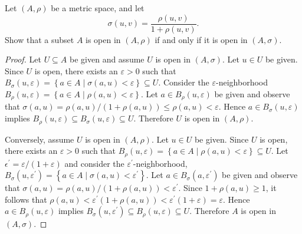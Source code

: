 \documentclass[10pt]{amsart}
\begin{document}
\begin{ex4}{}
  Let $(A,\rho)$ be a metric space, and let 
  $$\sigma(u,v) = \frac{\rho(u,v)}{1 + \rho(u,v)}.$$
  Show that a subset $A$ is open in $(A,\rho)$ if and only if it is open in $(A,\sigma)$.
  
  \begin{proof}
    Let $U \subseteq A$ be given and assume $U$ is open in $(A,\sigma)$.
    Let $u \in U$ be given.
    Since $U$ is open, there exists an $\varepsilon > 0$ such that $B_\sigma(u,\varepsilon) = \left\{a \in A \mid \sigma(a,u) < \varepsilon\right\} \subseteq U$.
    Consider the $\varepsilon$-neighborhood $B_\rho(u,\varepsilon) = \left\{ a \in A \mid \rho(a,u) < \varepsilon\right\}$.
    Let $a \in B_\rho(u,\varepsilon)$ be given and observe that $\sigma(a,u) = \rho(a,u)/(1 + \rho(a,u)) \leq \rho(a,u) < \varepsilon$.
    Hence $a \in B_\sigma(u,\varepsilon)$ implies $B_\rho(u,\varepsilon) \subseteq B_\sigma(u,\varepsilon) \subseteq U$.
    Therefore $U$ is open in $(A,\rho)$.
    
    Conversely, assume $U$ is open in $(A,\rho)$.
    Let $u \in U$ be given.
    Since $U$ is open, there exists an $\varepsilon > 0$ such that $B_\rho(u,\varepsilon) = \left\{a \in A \mid \rho(a,u) < \varepsilon\right\} \subseteq U$.
    Let $\epsilon^{\prime} = \varepsilon/(1 + \varepsilon)$ and consider the $\varepsilon^{\prime}$-neighborhood, $B_\sigma(u, \varepsilon^{\prime}) = \left\{a \in A \mid \sigma(a,u) < \varepsilon^{\prime} \right\}$.
    Let $a \in B_\sigma(a,\varepsilon^{\prime})$ be given and observe that $\sigma(a,u) = \rho(a,u)/(1 + \rho(a,u)) < \varepsilon^{\prime}$.
    Since $1 + \rho(a,u) \geq 1$, it follows that $\rho(a,u) < \varepsilon^{\prime}(1 + \rho(a,u)) < \varepsilon^{\prime}(1 + \varepsilon) = \varepsilon$.
    Hence $a \in B_\rho(u,\varepsilon)$ implies $B_\sigma(u,\varepsilon^{\prime}) \subseteq B_\rho(u,\varepsilon) \subseteq U$.
    Therefore $A$ is open in $(A,\sigma)$.
  \end{proof}
\end{ex4}{}
\end{document}
